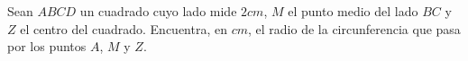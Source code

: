 Sean $ABCD$ un cuadrado cuyo lado mide $2cm$, $M$ el punto medio del lado $BC$ y $Z$ el centro del cuadrado. Encuentra, en $cm$, el radio de la circunferencia que pasa por los puntos $A$, $M$ y $Z$.